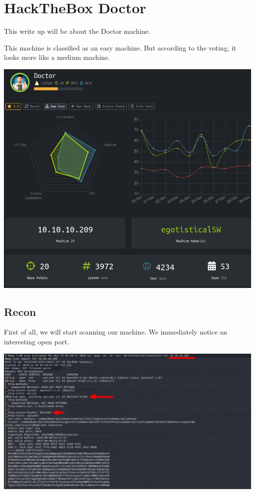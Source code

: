\documentclass[../main.tex]{subfiles}
\begin{document}
\section{HackTheBox Doctor}

This write up will be about the Doctor machine.

This machine is classified as an easy machine. But according to the voting, it looks more like a medium machine.

\includegraphics[width=\linewidth]{images/Nicolai/doctor_lab.png}

\clearpage

\subsection{Recon}

First of all, we will start scanning our machine. We immediately notice an interesting open port.

\includegraphics[width=\linewidth]{images/Nicolai/doctor-nmap.png}
\end{document}
